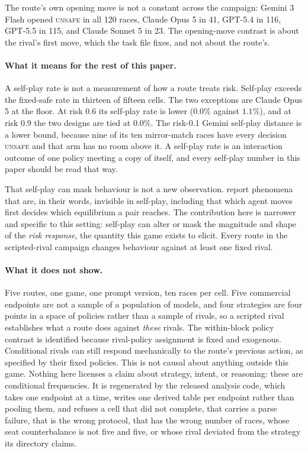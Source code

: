 \documentclass[sigconf,anonymous]{aamas}
\newcommand{\Unsafe}{\textsc{unsafe}}
\begin{document}
The route's own opening move is not a constant across the campaign: Gemini 3
Flash opened \Unsafe{} in all 120 races, Claude Opus 5 in 41, GPT-5.4 in 116,
GPT-5.5 in 115, and Claude Sonnet 5 in 23. The opening-move contrast is about
the rival's first move, which the task file fixes, and not about the route's.

\paragraph{What it means for the rest of this paper.} A self-play rate is not a
measurement of how a route treats risk. Self-play exceeds the fixed-safe rate
in thirteen of fifteen cells. The two exceptions are Claude Opus 5 at the
floor. At risk $0.6$ its self-play rate is lower ($0.0\%$ against $1.1\%$), and
at risk $0.9$ the two designs are tied at $0.0\%$. The risk-0.1 Gemini self-play distance is a lower bound,
because nine of its ten mirror-match races have every decision \Unsafe{} and
that arm has no room above it. A self-play rate is an interaction outcome of
one policy meeting a copy of itself, and every self-play number in this paper
should be read that way.

That self-play can mask behaviour is not a new observation.
\citet{lekeasNashSuppression2026} report phenomena that are, in their words,
invisible in self-play, including that which agent moves first decides which
equilibrium a pair reaches. The contribution here is narrower and specific to
this setting: self-play can alter or mask the magnitude and shape of the
\emph{risk response}, the quantity this game exists to elicit. Every route in
the scripted-rival campaign changes behaviour against at least one fixed rival.

\paragraph{What it does not show.} Five routes, one game, one prompt version,
ten races per cell. Five commercial endpoints are not a sample of a population
of models, and four strategies are four points in a space of policies rather
than a sample of rivals, so a scripted rival establishes what a route does
against \emph{these} rivals. The within-block policy contrast is identified
because rival-policy assignment is fixed and exogenous. Conditional rivals can
still respond mechanically to the route's previous action, as specified by
their fixed policies. This is not causal about anything outside this game.
Nothing here licenses a claim about strategy, intent, or
reasoning: these are conditional frequencies. It is regenerated by the
released analysis code, which takes one endpoint at a time, writes one derived table per endpoint rather than
pooling them, and refuses a cell that did not complete, that carries a parse
failure, that is the wrong protocol, that has the wrong number of races, whose
seat counterbalance is not five and five, or whose rival deviated from the
strategy its directory claims.
\end{document}
